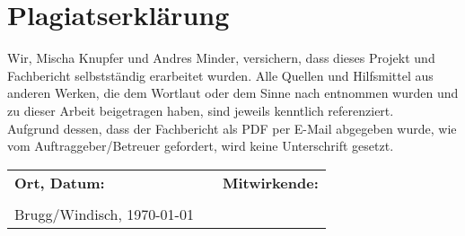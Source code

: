 \section{Plagiatserklärung}

Wir, Mischa Knupfer und Andres Minder, versichern, dass dieses Projekt und Fachbericht selbstständig erarbeitet wurden. Alle Quellen und Hilfsmittel aus anderen Werken, die dem Wortlaut oder dem Sinne nach entnommen wurden und zu dieser Arbeit beigetragen haben, sind jeweils kenntlich referenziert.\\

Aufgrund dessen, dass der Fachbericht als PDF per E-Mail abgegeben wurde, wie vom Auftraggeber/Betreuer gefordert, wird keine Unterschrift gesetzt. \\
\vfill
\begin{center}
\begin{tabular}{p{5cm}p{1cm}l}
\Large\textbf{Ort, Datum:} & & \Large\textbf{Mitwirkende:} \\
\vspace{1cm} & \vspace{1cm} & \vspace{1cm} \\
\Large{Brugg/Windisch, \today} & & \\
\end{tabular}
\end{center}